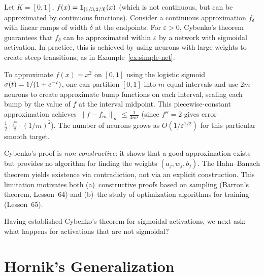 \documentclass[11pt,a4paper]{article}
\begin{document}
\begin{example}
\label{ex:step-approx}
Let $K = [0,1]$, $f(x) = \mathbf{1}_{[1/3, 2/3]}(x)$ (which is not
continuous, but can be approximated by continuous functions).  Consider
a continuous approximation $f_\delta$ with linear ramps of width $\delta$
at the endpoints.  For $\varepsilon > 0$, Cybenko's theorem guarantees
that $f_\delta$ can be approximated within $\varepsilon$ by a network
with sigmoidal activation.  In practice, this is achieved by using neurons
with large weights to create steep transitions, as in
Example~\ref{ex:simple-net}.
\end{example}

\begin{example}
\label{ex:constructive-1d}
To approximate $f(x) = x^2$ on $[0,1]$ using the logistic sigmoid
$\sigma(t) = 1/(1+e^{-t})$, one can partition $[0,1]$ into $m$ equal
intervals and use $2m$ neurons to create approximate bump functions on
each interval, scaling each bump by the value of $f$ at the interval
midpoint.  This piecewise-constant approximation achieves
$\|f - f_m\|_\infty \le \frac{1}{4m^2}$ (since $f'' = 2$ gives error
$\frac{1}{2} \cdot \frac{f''}{8} \cdot (1/m)^2$).  The number of neurons
grows as $O(1/\varepsilon^{1/2})$ for this particular smooth target.
\end{example}

\begin{remark}
\label{rem:non-constructive}
Cybenko's proof is \emph{non-constructive}: it shows that a good
approximation exists but provides no algorithm for finding the weights
$(a_j, w_j, b_j)$.  The Hahn--Banach theorem yields existence via
contradiction, not via an explicit construction.  This limitation motivates
both (a)~constructive proofs based on sampling (Barron's theorem,
Lesson~64) and (b)~the study of optimization algorithms for training
(Lesson~65).
\end{remark}

Having established Cybenko's theorem for sigmoidal activations, we next
ask: what happens for activations that are not sigmoidal?

\section{Hornik's Generalization}
\label{sec:hornik}
\end{document}
